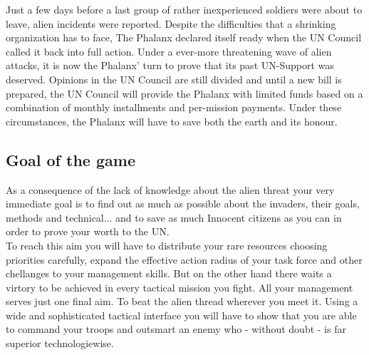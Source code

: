 Just a few days before a last group of rather inexperienced soldiers were about to leave, alien incidents were reported. Despite the difficulties that a shrinking organization has to face, The Phalanx declared itself ready when the UN Council called it back into full action. Under a ever-more threatening wave of alien attacks, it is now the Phalanx' turn to prove that its past UN-Support was deserved. Opinions in the UN Council are still divided and until a new bill is prepared, the UN Council will provide the Phalanx with limited funds based on a combination of monthly installments and per-mission payments. Under these circumstances, the Phalanx will have to save both the earth and its honour.

\subsection{Goal of the game}
As a consequence of the lack of knowledge about the alien threat your very immediate goal is to find out as much as possible about the invaders, their goals, methods and technical... and to save as much Innocent citizens as you can in order to prove your worth to the UN.\\
To reach this aim you will have to distribute your rare resources choosing priorities carefully, expand the effective action radius of your task force and other chellanges to your management skills. But on the other hand there waits a virtory to be achieved in every tactical mission you fight. All your management serves just one final aim. To beat the alien thread wherever you meet it. Using a wide and sophisticated tactical interface you will have to show that you are able to command your troops and outsmart an enemy who - without doubt - is far superior technologiewise.
